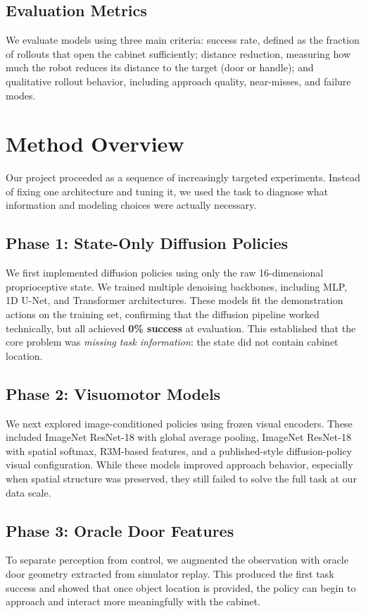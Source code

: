 \documentclass[10pt,conference]{IEEEtran}
\newcommand{\best}[1]{\textbf{#1}}
\begin{document}
\subsection{Evaluation Metrics}
We evaluate models using three main criteria: success rate, defined as the fraction of rollouts that open the cabinet sufficiently; distance reduction, measuring how much the robot reduces its distance to the target (door or handle); and qualitative rollout behavior, including approach quality, near-misses, and failure modes.

\section{Method Overview}
Our project proceeded as a sequence of increasingly targeted experiments. Instead of fixing one architecture and tuning it, we used the task to diagnose what information and modeling choices were actually necessary.

\subsection{Phase 1: State-Only Diffusion Policies}
We first implemented diffusion policies using only the raw 16-dimensional proprioceptive state. We trained multiple denoising backbones, including MLP, 1D U-Net, and Transformer architectures. These models fit the demonstration actions on the training set, confirming that the diffusion pipeline worked technically, but all achieved \best{0\% success} at evaluation. This established that the core problem was \emph{missing task information}: the state did not contain cabinet location.

\subsection{Phase 2: Visuomotor Models}
We next explored image-conditioned policies using frozen visual encoders. These included ImageNet ResNet-18 with global average pooling, ImageNet ResNet-18 with spatial softmax, R3M-based features, and a published-style diffusion-policy visual configuration. While these models improved approach behavior, especially when spatial structure was preserved, they still failed to solve the full task at our data scale.

\subsection{Phase 3: Oracle Door Features}
To separate perception from control, we augmented the observation with oracle door geometry extracted from simulator replay. This produced the first task success and showed that once object location is provided, the policy can begin to approach and interact more meaningfully with the cabinet.
\end{document}

